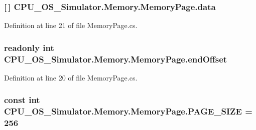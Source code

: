 \subsubsection[{data}]{ \mbox{[}$\,$\mbox{]} C\+P\+U\+\_\+\+O\+S\+\_\+\+Simulator.\+Memory.\+Memory\+Page.\+data\hspace{0.3cm}{\ttfamily [private]}}\label{class_c_p_u___o_s___simulator_1_1_memory_1_1_memory_page_af9ab25101e7920de2344e0fa5ddfaa27}


Definition at line 21 of file Memory\+Page.\+cs.

\hypertarget{class_c_p_u___o_s___simulator_1_1_memory_1_1_memory_page_ae2f8f419909326ce5449d37af9ff7c89}{}
\subsubsection[{end\+Offset}]{\setlength{\rightskip}{0pt plus 5cm}readonly int C\+P\+U\+\_\+\+O\+S\+\_\+\+Simulator.\+Memory.\+Memory\+Page.\+end\+Offset\hspace{0.3cm}{\ttfamily [private]}}\label{class_c_p_u___o_s___simulator_1_1_memory_1_1_memory_page_ae2f8f419909326ce5449d37af9ff7c89}


Definition at line 20 of file Memory\+Page.\+cs.

\hypertarget{class_c_p_u___o_s___simulator_1_1_memory_1_1_memory_page_a502abee83030136a808d5b5f0c0fe7ec}{}
\subsubsection[{P\+A\+G\+E\+\_\+\+S\+I\+Z\+E}]{\setlength{\rightskip}{0pt plus 5cm}const int C\+P\+U\+\_\+\+O\+S\+\_\+\+Simulator.\+Memory.\+Memory\+Page.\+P\+A\+G\+E\+\_\+\+S\+I\+Z\+E = 256}\label{class_c_p_u___o_s___simulator_1_1_memory_1_1_memory_page_a502abee83030136a808d5b5f0c0fe7ec}


